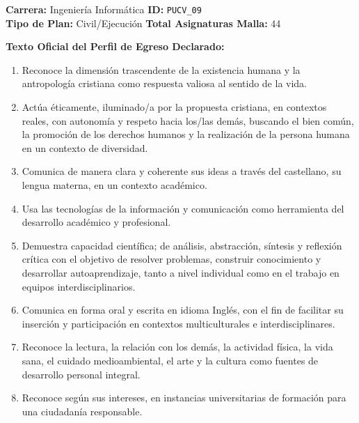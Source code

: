 \documentclass[11pt,a4paper]{article}
\begin{document}
\vspace{10pt}

\begin{tcolorbox}[fichaStyle, title={UNIVERSIDAD 09: Pontificia Universidad Católica de Valparaíso (PUCV)}]
\small\sffamily
\textbf{Carrera:} Ingeniería Informática \hfill \textbf{ID:} \texttt{PUCV\_09} \\
\textbf{Tipo de Plan:} Civil/Ejecución \hfill \textbf{Total Asignaturas Malla:} 44

\tcbline

\textbf{Texto Oficial del Perfil de Egreso Declarado:}\vspace{4pt}
{\small\rmfamily
\begin{enumerate}[noitemsep, leftmargin=*]
    \item Reconoce la dimensión trascendente de la existencia humana y la antropología cristiana como respuesta valiosa al sentido de la vida.
    \item Actúa éticamente, iluminado/a por la propuesta cristiana, en contextos reales, con autonomía y respeto hacia los/las demás, buscando el bien común, la promoción de los derechos humanos y la realización de la persona humana en un contexto de diversidad.
    \item Comunica de manera clara y coherente sus ideas a través del castellano, su lengua materna, en un contexto académico.
    \item Usa las tecnologías de la información y comunicación como herramienta del desarrollo académico y profesional.
    \item Demuestra capacidad científica; de análisis, abstracción, síntesis y reflexión crítica con el objetivo de resolver problemas, construir conocimiento y desarrollar autoaprendizaje, tanto a nivel individual como en el trabajo en equipos interdisciplinarios.
    \item Comunica en forma oral y escrita en idioma Inglés, con el fin de facilitar su inserción y participación en contextos multiculturales e interdisciplinares.
    \item Reconoce la lectura, la relación con los demás, la actividad física, la vida sana, el cuidado medioambiental, el arte y la cultura como fuentes de desarrollo personal integral.
    \item Reconoce según sus intereses, en instancias universitarias de formación para una ciudadanía responsable.
\end{enumerate}
}
\end{tcolorbox}
\end{document}
